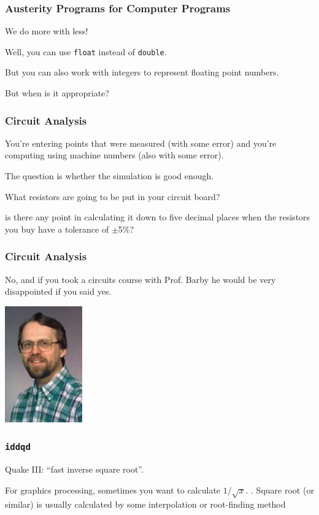 \begin{frame}
\frametitle{Austerity Programs for Computer Programs}

We do more with less! 

Well, you can use \texttt{float} instead of \texttt{double}. 

But you can also work with integers to represent floating point numbers.

But when is it appropriate?


\end{frame}


\begin{frame}
\frametitle{Circuit Analysis}

You're entering points that were measured (with some error) and you're computing using machine numbers (also with some error).

The question is whether the simulation is good enough.

What resistors are going to be put in your circuit board?

is there any point in calculating it down to five decimal places when the resistors you buy have a tolerance of $\pm$5\%? 

\end{frame}


\begin{frame}
\frametitle{Circuit Analysis}


No, and if you took a circuits course with Prof. Barby he would be very disappointed if you said yes.

\begin{center}
	\includegraphics[width=0.25\textwidth]{images/barby_0.jpg}
\end{center}

\end{frame}


\begin{frame}
\frametitle{\texttt{iddqd}}

Quake III: ``fast inverse square root''. 

For graphics processing, sometimes you want to calculate $1/\sqrt{x}$.
.
Square root (or similar) is usually calculated by some interpolation or root-finding method

\end{frame}


